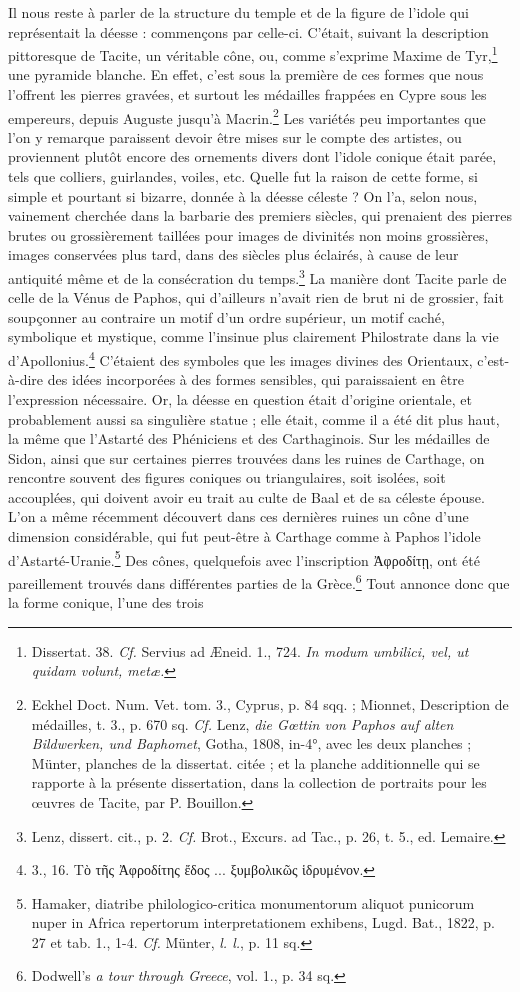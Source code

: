 \documentclass[a4paper, 11pt, oneside, polutonikogreek, french]{article}
\begin{document}
Il nous reste à parler de la structure du temple et de la figure de l'idole qui représentait la déesse : commençons par celle-ci. C'était, suivant la description pittoresque de Tacite, un véritable cône, ou, comme s'exprime Maxime de Tyr,\footnote{Dissertat. 38. \emph{Cf.} Servius ad Æneid. 1., 724. \emph{In modum umbilici, vel, ut quidam volunt, metæ.}} une pyramide blanche. En effet, c'est sous la première de ces formes que nous l'offrent les pierres gravées, et surtout les médailles frappées en Cypre sous les empereurs, depuis Auguste jusqu'à Macrin.\footnote{Eckhel Doct. Num. Vet. tom. 3., Cyprus, p. 84 sqq. ; Mionnet, Description de médailles, t. 3., p. 670 sq. \emph{Cf.} Lenz, \emph{die Gœttin von Paphos auf alten Bildwerken, und Baphomet}, Gotha, 1808, in-4°, avec les deux planches ; Münter, planches de la dissertat. citée ; et la planche additionnelle qui se rapporte à la présente dissertation, dans la collection de portraits pour les œuvres de Tacite, par P. Bouillon.} Les variétés peu importantes que l'on y remarque paraissent devoir être mises sur le compte des artistes, ou proviennent plutôt encore des ornements divers dont l'idole conique était parée, tels que colliers, guirlandes, voiles, etc. Quelle fut la raison de cette forme, si simple et pourtant si bizarre, donnée à la déesse céleste ? On l'a, selon nous, vainement cherchée dans la barbarie des premiers siècles, qui prenaient des pierres brutes ou grossièrement taillées pour images de divinités non moins grossières, images conservées plus tard, dans des siècles plus éclairés, à cause de leur antiquité même et de la consécration du temps.\footnote{Lenz, dissert. cit., p. 2. \emph{Cf.} Brot., Excurs. ad Tac., p. 26, t. 5., ed. Lemaire.} La manière dont Tacite parle de celle de la Vénus de Paphos, qui d'ailleurs n'avait rien de brut ni de grossier, fait soupçonner au contraire un motif d'un ordre supérieur, un motif caché, symbolique et mystique, comme l'insinue plus clairement Philostrate dans la vie d'Apollonius.\footnote{3., 16. Τὸ τῆς Ἀφροδίτης ἔδος ... ξυμβολικῶς ἱδρυμένον.} C'étaient des symboles que les images divines des Orientaux, c'est-à-dire des idées incorporées à des formes sensibles, qui paraissaient en être l'expression nécessaire. Or, la déesse en question était d'origine orientale, et probablement aussi sa singulière statue ; elle était, comme il a été dit plus haut, la même que l'Astarté des Phéniciens et des Carthaginois. Sur les médailles de Sidon, ainsi que sur certaines pierres trouvées dans les ruines de Carthage, on rencontre souvent des figures coniques ou triangulaires, soit isolées, soit accouplées, qui doivent avoir eu trait au culte de Baal et de sa céleste épouse. L'on a même récemment découvert dans ces dernières ruines un cône d'une dimension considérable, qui fut peut-être à Carthage comme à Paphos l'idole d'Astarté-Uranie.\footnote{Hamaker, diatribe philologico-critica monumentorum aliquot punicorum nuper in Africa repertorum interpretationem exhibens, Lugd. Bat., 1822, p. 27 et tab. 1., 1-4. \emph{Cf.} Münter, \emph{l. l.}, p. 11 sq.} Des cônes, quelquefois avec l'inscription Ἀφροδίτῃ, ont été pareillement trouvés dans différentes parties de la Grèce.\footnote{Dodwell's \emph{a tour through Greece}, vol. 1., p. 34 sq.} Tout annonce donc que la forme conique, l'une des trois 
\end{document}
